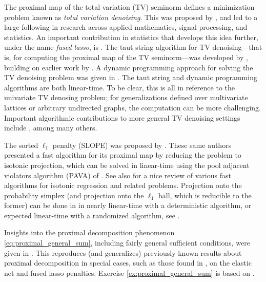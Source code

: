 The proximal map of the total variation (TV) seminorm defines a minimization
problem known as \emph{total variation denoising}. This was proposed by
\cite{rudin1992nonlinear}, and led to a large following in research across
applied mathematics, signal processing, and statistics. An important
contribution in statistics that develops this idea further, under the name
\emph{fused lasso}, is \cite{tibshirani2005sparsity}. The taut string algorithm
for TV denoising---that is, for computing the proximal map of the TV
seminorm---was developed by \cite{davies2001local}, building on earlier work by
\cite{mammen1997locally}. A dynamic programming approach for solving the TV
denoising problem was given in \cite{johnson2013dynamic}. The taut string and
dynamic programming algorithms are both linear-time. To be clear, this is all in
reference to the univariate TV denosing problem; for generalizations defined
over multivariate lattices or arbitrary undirected graphs, the computation can
be more challenging. Important algorithmic contributions to more general TV 
denoising settings include \cite{chambolle2009total, chambolle2011first,
  barbero2018modular}, among many others. 

The sorted $\ell_1$ penalty (SLOPE) was proposed by \cite{bogdan2015slope}. 
These same authors presented a fast algorithm for its proximal map by reducing
the problem to isotonic projection, which can be solved in linear-time using the
pool adjacent violators algorithm (PAVA) of \cite{barlow1972statistical}. See
also \cite{deleeuw2010isotonic} for a nice review of various fast algorithms for
isotonic regression and related problems. Projection onto the probability
simplex (and projection onto the $\ell_1$ ball, which is reducible to the
former) can be done in in nearly linear-time with a deterministic algorithm, or
expected linear-time with a randomized algorithm, see \cite{duchi2008efficient, 
  condat2016fast}.   

Insights into the proximal decomposition phenomenon
\eqref{eq:proximal_general_sum}, including fairly general sufficient conditions,
were given in \cite{yu2013decomposing}. This reproduces (and generalizes)
previously known results about proximal decomposition in special cases, such as 
those found in \cite{friedman2007pathwise}, on the elastic net and fused lasso 
penalties. Exercise \ref{ex:proximal_general_sum} is based on
\cite{yu2013decomposing}.     

\clearpage

